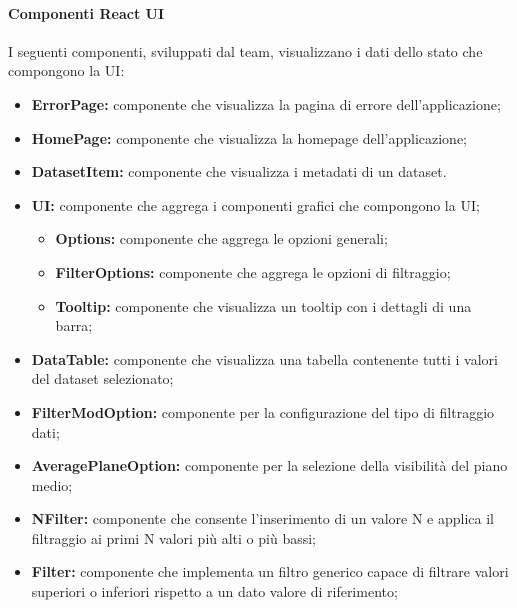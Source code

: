 \paragraph{Componenti React UI}
I seguenti componenti, sviluppati dal team, visualizzano i dati dello stato che
compongono la UI:
\begin{itemize}
    \item \textbf{ErrorPage:} componente che visualizza la pagina di errore dell'applicazione;
    \item \textbf{HomePage:} componente che visualizza la homepage dell'applicazione;
    \item \textbf{DatasetItem:} componente che visualizza i metadati di un dataset.
    \item \textbf{UI:} componente che aggrega i componenti grafici che compongono la UI;
          \begin{itemize}
              \item \textbf{Options:} componente che aggrega le opzioni generali;
              \item \textbf{FilterOptions:} componente che aggrega le opzioni di filtraggio;
              \item \textbf{Tooltip:} componente che visualizza un tooltip con i dettagli di una barra;
          \end{itemize}
    \item \textbf{DataTable:} componente che visualizza una tabella contenente tutti i valori del dataset selezionato;
    \item \textbf{FilterModOption:} componente per la configurazione del tipo di filtraggio dati;
    \item \textbf{AveragePlaneOption:} componente per la selezione della visibilità del piano medio;
    \item \textbf{NFilter:} componente che consente l'inserimento di un valore N e applica il filtraggio ai primi N valori più alti o più bassi;
    \item \textbf{Filter:} componente che implementa un filtro generico capace di filtrare valori superiori o inferiori rispetto a un dato valore di riferimento;
\end{itemize}
